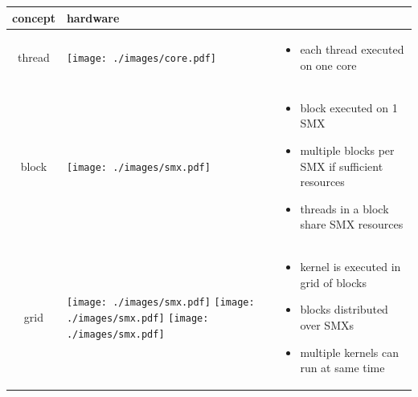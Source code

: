 \documentclass[aspectratio=43]{beamer}
\begin{document}
\begin{frame}[fragile]{}
\begin{center}
\vspace{-0.75cm}
\begin{tabular}{|c|m{4cm}|m{5cm}|}
    \cline{1-2}
        concept & hardware &  \multicolumn{1}{c}{} \\
    \hline
        thread &
        \begin{minipage}{4cm}
            \texttt{[image: ./images/core.pdf]}
        \end{minipage} &
        \footnotesize
        \begin{itemize}
            \item each thread executed on one core
        \end{itemize} \\
    \hline
        block &
        \begin{minipage}{4cm}
            \texttt{[image: ./images/smx.pdf]}
        \end{minipage} &
        \footnotesize
        \begin{itemize}
            \item block executed on 1 SMX
            \item multiple blocks per SMX if sufficient resources
            \item threads in a block share SMX resources
        \end{itemize} \\
    \hline
        grid &
        \begin{minipage}{4cm}
            \texttt{[image: ./images/smx.pdf]}
            \texttt{[image: ./images/smx.pdf]}
            \texttt{[image: ./images/smx.pdf]}
        \end{minipage} &
        \footnotesize
        \begin{itemize}
            \item kernel is executed in grid of blocks
            \item blocks distributed over SMXs
            \item multiple kernels can run at same time
        \end{itemize} \\
\hline
\end{tabular}
\end{center}
\end{frame}
\end{document}
